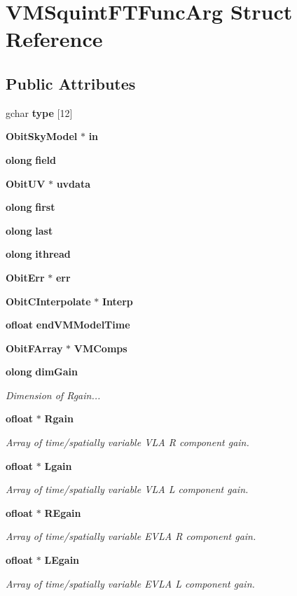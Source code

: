 \section{VMSquint\-FTFunc\-Arg Struct Reference}
\label{structVMSquintFTFuncArg}
\subsection*{Public Attributes}
\begin{CompactItemize}
\item 
gchar {\bf type} [12]
\item 
{\bf Obit\-Sky\-Model} $\ast$ {\bf in}
\item 
{\bf olong} {\bf field}
\item 
{\bf Obit\-UV} $\ast$ {\bf uvdata}
\item 
{\bf olong} {\bf first}
\item 
{\bf olong} {\bf last}
\item 
{\bf olong} {\bf ithread}
\item 
{\bf Obit\-Err} $\ast$ {\bf err}
\item 
{\bf Obit\-CInterpolate} $\ast$ {\bf Interp}
\item 
{\bf ofloat} {\bf end\-VMModel\-Time}
\item 
{\bf Obit\-FArray} $\ast$ {\bf VMComps}
\item 
{\bf olong} {\bf dim\-Gain}
\begin{CompactList}\small\item\em Dimension of Rgain... \item\end{CompactList}\item 
{\bf ofloat} $\ast$ {\bf Rgain}
\begin{CompactList}\small\item\em Array of time/spatially variable VLA R component gain. \item\end{CompactList}\item 
{\bf ofloat} $\ast$ {\bf Lgain}
\begin{CompactList}\small\item\em Array of time/spatially variable VLA L component gain. \item\end{CompactList}\item 
{\bf ofloat} $\ast$ {\bf REgain}
\begin{CompactList}\small\item\em Array of time/spatially variable EVLA R component gain. \item\end{CompactList}\item 
{\bf ofloat} $\ast$ {\bf LEgain}
\begin{CompactList}\small\item\em Array of time/spatially variable EVLA L component gain. \item\end{CompactList}\end{CompactItemize}


